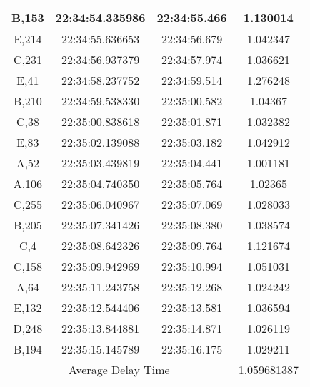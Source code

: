 \begin{longtable}{|ccc|c|}
    \multicolumn{1}{|c|}{B,153} & \multicolumn{1}{c|}{22:34:54.335986} & 22:34:55.466       & 1.130014    \\ \hline
    \multicolumn{1}{|c|}{E,214} & \multicolumn{1}{c|}{22:34:55.636653} & 22:34:56.679       & 1.042347    \\ \hline
    \multicolumn{1}{|c|}{C,231} & \multicolumn{1}{c|}{22:34:56.937379} & 22:34:57.974       & 1.036621    \\ \hline
    \multicolumn{1}{|c|}{E,41}  & \multicolumn{1}{c|}{22:34:58.237752} & 22:34:59.514       & 1.276248    \\ \hline
    \multicolumn{1}{|c|}{B,210} & \multicolumn{1}{c|}{22:34:59.538330} & 22:35:00.582       & 1.04367     \\ \hline
    \multicolumn{1}{|c|}{C,38}  & \multicolumn{1}{c|}{22:35:00.838618} & 22:35:01.871       & 1.032382    \\ \hline
    \multicolumn{1}{|c|}{E,83}  & \multicolumn{1}{c|}{22:35:02.139088} & 22:35:03.182       & 1.042912    \\ \hline
    \multicolumn{1}{|c|}{A,52}  & \multicolumn{1}{c|}{22:35:03.439819} & 22:35:04.441       & 1.001181    \\ \hline
    \multicolumn{1}{|c|}{A,106} & \multicolumn{1}{c|}{22:35:04.740350} & 22:35:05.764       & 1.02365     \\ \hline
    \multicolumn{1}{|c|}{C,255} & \multicolumn{1}{c|}{22:35:06.040967} & 22:35:07.069       & 1.028033    \\ \hline
    \multicolumn{1}{|c|}{B,205} & \multicolumn{1}{c|}{22:35:07.341426} & 22:35:08.380       & 1.038574    \\ \hline
    \multicolumn{1}{|c|}{C,4}   & \multicolumn{1}{c|}{22:35:08.642326} & 22:35:09.764       & 1.121674    \\ \hline
    \multicolumn{1}{|c|}{C,158} & \multicolumn{1}{c|}{22:35:09.942969} & 22:35:10.994       & 1.051031    \\ \hline
    \multicolumn{1}{|c|}{A,64}  & \multicolumn{1}{c|}{22:35:11.243758} & 22:35:12.268       & 1.024242    \\ \hline
    \multicolumn{1}{|c|}{E,132} & \multicolumn{1}{c|}{22:35:12.544406} & 22:35:13.581       & 1.036594    \\ \hline
    \multicolumn{1}{|c|}{D,248} & \multicolumn{1}{c|}{22:35:13.844881} & 22:35:14.871       & 1.026119    \\ \hline
    \multicolumn{1}{|c|}{B,194} & \multicolumn{1}{c|}{22:35:15.145789} & 22:35:16.175       & 1.029211    \\ \hline
    \multicolumn{3}{|c|}{Average Delay Time}                                                & 1.059681387 \\ \hline
\end{longtable}

